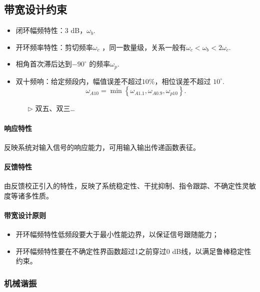 \documentclass[14pt,a4paper]{article}
\theoremstyle{plain}
\theoremstyle{definition}
\theoremstyle{remark}
\theoremstyle{plain}
\theoremstyle{plain}
\theoremstyle{definition}
\begin{document}
		\subsection{带宽设计约束}%
		\label{sub:带宽设计约束}
	
			\begin{itemize}
				\item 闭环幅频特性：$3$ dB，$\omega_{b}$. 
				\item 开环频率特性：剪切频率$\omega_{c}$ ，同一数量级，关系一般有$\omega_c < \omega_{b} < 2\omega_{c}$.
				\item 相角首次滞后达到$-90^\circ $ 的频率$\omega_{p}$. 
				\item 双十频响：给定频段内，幅值误差不超过$10\%$，相位误差不超过 $10^\circ $. 
					\[
					\omega_{A 10} = \mathop{\text{min}} \left\{ \omega_{A 1.1}, \omega_{A 0.9}, \omega_{p 10} \right\} 
					.\] 
					\begin{itemize}
						\item[$\triangleright$] 双五、双三\ldots 
					\end{itemize}  
			\end{itemize}  
		
			\paragraph{响应特性}%
			
				反映系统对输入信号的响应能力，可用输入输出传递函数表征。

			\paragraph{反馈特性}%

				由反馈校正引入的特性，反映了系统稳定性、干扰抑制、指令跟踪、不确定性灵敏度等诸多性质。 

			\paragraph{带宽设计原则}%
			\label{par:带宽设计原则}
			
				\begin{itemize}
					\item 开环幅频特性低频段要大于最小性能边界，以保证信号跟随能力；
					\item 开环幅频特性要在不确定性界函数超过1之前穿过$0$ dB线，以满足鲁棒稳定性约束。
				\end{itemize}  

			\subsubsection{机械谐振}%
			\label{ssub:机械谐振}
			
\end{document}

